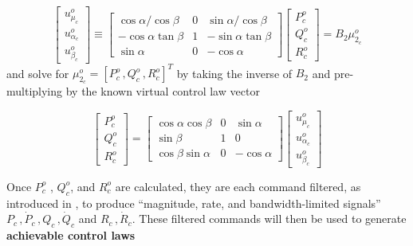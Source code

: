 \documentclass[12pt]{ucthesis}
\begin{document}
	\begin{equation}
		\left[ \begin{array}{c} u^{o}_{\mu_c} \\ u^{o}_{\alpha_c} \\ u^{o}_{\beta_c} \end{array} \right] \equiv \left[ \begin{array}{ccc} \cos\alpha / \cos\beta & 0 & \sin\alpha / \cos\beta \\ -\cos\alpha\tan\beta & 1 & -\sin\alpha\tan\beta \\ \sin\alpha & 0 & -\cos\alpha \end{array} \right] \left[ \begin{array}{c} P^o_c \\ Q^o_c \\ R^o_c \end{array} \right] = B_2 \mu^o_{2_c}
	\end{equation}
and solve for $\mu^o_{2_c} = [P^o_c\,,Q^o_c\,,R^o_c]^T$ by taking the inverse of $B_2$ and pre-multiplying by the known virtual control law vector

	\begin{equation}
		\left[ \begin{array}{c} P^o_c \\ Q^o_c \\ R^o_c \end{array} \right]  = \left[ \begin{array}{ccc} \cos\alpha\cos\beta & 0 & \sin\alpha \\ \sin\beta & 1 & 0 \\ \cos\beta\sin\alpha & 0 & -\cos\alpha \end{array} \right] \left[ \begin{array}{c} u^{o}_{\mu_c} \\ u^{o}_{\alpha_c} \\ u^{o}_{\beta_c} \end{array} \right]
	\end{equation}

Once $P^o_c$ , $Q^o_c$, and $R^o_c$ are calculated, they are each command filtered, as introduced in , to produce ``magnitude, rate, and bandwidth-limited signals'' $P_c\,,\dot{P}_c\,,Q_c\,,\dot{Q}_c$ and $R_c\,,\dot{R}_c$. These filtered commands will then be used to generate \textbf{achievable control laws}
\end{document}
